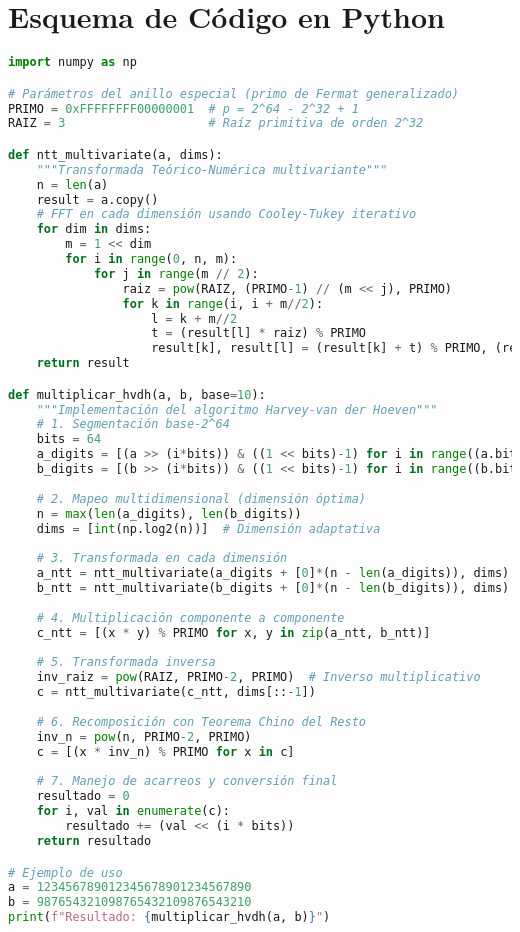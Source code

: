 \documentclass{article}
\begin{document}
\section{Esquema de Código en Python}
\begin{lstlisting}[language=Python, caption=Implementación mejorada con NTT multivariante]
import numpy as np

# Parámetros del anillo especial (primo de Fermat generalizado)
PRIMO = 0xFFFFFFFF00000001  # p = 2^64 - 2^32 + 1
RAIZ = 3                    # Raíz primitiva de orden 2^32

def ntt_multivariate(a, dims):
    """Transformada Teórico-Numérica multivariante"""
    n = len(a)
    result = a.copy()
    # FFT en cada dimensión usando Cooley-Tukey iterativo
    for dim in dims:
        m = 1 << dim
        for i in range(0, n, m):
            for j in range(m // 2):
                raiz = pow(RAIZ, (PRIMO-1) // (m << j), PRIMO)
                for k in range(i, i + m//2):
                    l = k + m//2
                    t = (result[l] * raiz) % PRIMO
                    result[k], result[l] = (result[k] + t) % PRIMO, (result[k] - t) % PRIMO
    return result

def multiplicar_hvdh(a, b, base=10):
    """Implementación del algoritmo Harvey-van der Hoeven"""
    # 1. Segmentación base-2^64
    bits = 64
    a_digits = [(a >> (i*bits)) & ((1 << bits)-1) for i in range((a.bit_length()+63)//64)]
    b_digits = [(b >> (i*bits)) & ((1 << bits)-1) for i in range((b.bit_length()+63)//64)]
    
    # 2. Mapeo multidimensional (dimensión óptima)
    n = max(len(a_digits), len(b_digits))
    dims = [int(np.log2(n))]  # Dimensión adaptativa
    
    # 3. Transformada en cada dimensión
    a_ntt = ntt_multivariate(a_digits + [0]*(n - len(a_digits)), dims)
    b_ntt = ntt_multivariate(b_digits + [0]*(n - len(b_digits)), dims)
    
    # 4. Multiplicación componente a componente
    c_ntt = [(x * y) % PRIMO for x, y in zip(a_ntt, b_ntt)]
    
    # 5. Transformada inversa
    inv_raiz = pow(RAIZ, PRIMO-2, PRIMO)  # Inverso multiplicativo
    c = ntt_multivariate(c_ntt, dims[::-1])
    
    # 6. Recomposición con Teorema Chino del Resto
    inv_n = pow(n, PRIMO-2, PRIMO)
    c = [(x * inv_n) % PRIMO for x in c]
    
    # 7. Manejo de acarreos y conversión final
    resultado = 0
    for i, val in enumerate(c):
        resultado += (val << (i * bits))
    return resultado

# Ejemplo de uso
a = 123456789012345678901234567890
b = 987654321098765432109876543210
print(f"Resultado: {multiplicar_hvdh(a, b)}")
\end{lstlisting}
\end{document}
